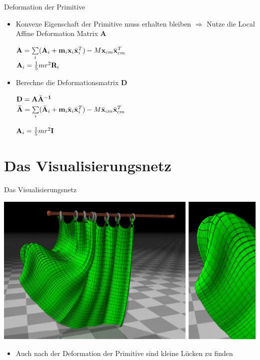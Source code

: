\documentclass[t]{beamer}
\begin{document}
	\begin{frame}{Deformation der Primitive}
		\begin{itemize}
			\item Konvexe Eigenschaft der Primitive muss erhalten bleiben
					$\Rightarrow$ Nutze die Local Affine Deformation Matrix $\mathbf{A}$
					\begin{center}
						$\mathnormal{\mathbf{A}}=\sum\limits_{\mathnormal{i}}(\mathnormal{\mathbf{A}_i}+\mathnormal{\mathbf{m}_i \mathbf{x}_i \mathbf{\bar{x}}_i^T})-M\mathnormal{\mathbf{x}_{cm} \mathbf{\bar{x}}_{cm}^T}$ \\
						$\mathnormal{\mathbf{A}_{i}}=\frac{1}{5}mr^2\mathbf{R}_\mathnormal{i}$
					\end{center}
			\item Berechne die Deformationsmatrix \textbf{D}
				\begin{center}
					$\mathnormal{\mathbf{D}}=\mathnormal{\mathbf{A \bar{A}^{-1}}}$ \\
					$\mathbf{\bar{A}}=\sum\limits_{\mathnormal{i}}(\mathnormal{\mathbf{\bar{A}}_i+\mathbf{m}_i\mathbf{\bar{x}}_i\mathbf{\bar{x}}_i^T})-M\mathnormal{\mathbf{\bar{x}}_{cm} \mathbf{\bar{x}}_{cm}^T}$
				\end{center}
				\begin{center}
					$\mathnormal{\mathbf{A}_{i}}=\frac{1}{5}mr^2\mathbf{I}$
				\end{center}
		\end{itemize}
	\end{frame}
	
	\section{Das Visualisierungsnetz}
	\begin{frame}{Das Visualisierungsnetz}
		\begin{center}
			\includegraphics[scale = 0.275]{Curtain_2.png}
		\end{center}
		\begin{itemize}
			\item Auch nach der Deformation der Primitive sind kleine Lücken zu finden
		\end{itemize}
	\end{frame}
	
\end{document}
